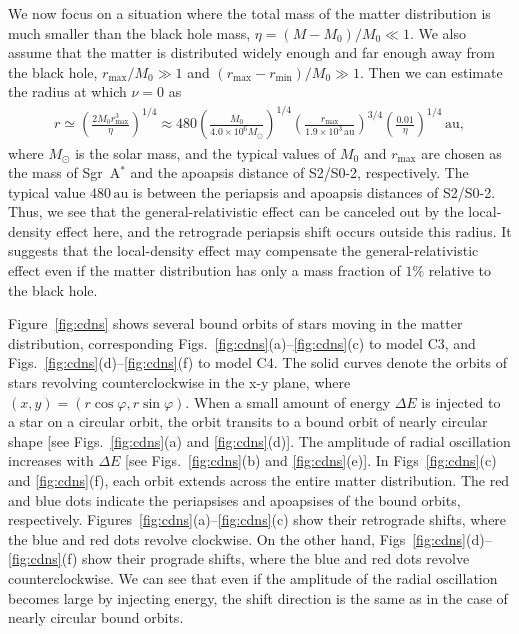 \documentclass[aps,11pt,nofootinbib,preprintnumbers,groupedaddress,superscriptaddress]{revtex4-2}
\begin{document}
We now focus on a situation where the total mass of the matter distribution is 
much smaller than the black hole mass, $\eta=(M-M_0)/M_0\ll 1$. 
We also assume that the matter is distributed widely enough and far enough away from the black hole, 
$r_{\mathrm{max}}/M_0\gg 1$ and $(r_{\mathrm{max}}-r_{\mathrm{min}})/M_0 \gg1$. 
Then we can estimate the radius at which $\nu=0$ as 
\begin{align}
r\simeq \left(\frac{2M_0 r_{\mathrm{max}}^3}{\eta}\right)^{1/4}
\approx 480 \left(\frac{M_0}{4.0\times 10^{6} M_{\odot}}\right)^{1/4}
\left(\frac{r_{\mathrm{max}}}{1.9\times 10^3 \,\mathrm{au}}\right)^{3/4}
\left(\frac{0.01}{\eta}\right)^{1/4} \,\mathrm{au},
\end{align}
where $M_\odot$ is the solar mass, and the typical values of $M_0$ and $r_{\mathrm{max}}$ are chosen as the mass of Sgr~A$^\ast$ 
and the apoapsis distance of S2/S0-2, respectively. 
The typical value $480 \,\mathrm{au}$ 
is between the periapsis and apoapsis distances of S2/S0-2.
Thus, we see that the general-relativistic effect 
can be
canceled out by the 
local-density effect here, and the retrograde 
periapsis shift occurs outside this radius. 
It suggests that the 
local-density
effect may compensate the general-relativistic effect 
even if the matter distribution has only a mass fraction of $1\%$ relative to the black hole. 



Figure~\ref{fig:cdns} shows 
several bound orbits of 
stars moving in the matter distribution,
corresponding Figs.~\ref{fig:cdns}(a)--\ref{fig:cdns}(c) to model C3, and 
Figs.~\ref{fig:cdns}(d)--\ref{fig:cdns}(f) to model C4.
The solid curves denote the orbits of stars revolving counterclockwise
in the x-y plane, where $(x,y)=(r\cos \varphi, r \sin \varphi)$. 
When a small amount of energy $\Delta E$ is injected to a star on a circular orbit, 
the orbit transits to a 
bound orbit
of nearly circular shape [see Figs.~\ref{fig:cdns}(a) and \ref{fig:cdns}(d)]. 
The amplitude of radial oscillation increases with $\Delta E$ [see Figs.~\ref{fig:cdns}(b) and \ref{fig:cdns}(e)]. In Figs~\ref{fig:cdns}(c) and \ref{fig:cdns}(f), each orbit extends across the entire matter distribution. 
The red and blue dots indicate the periapsises and apoapsises of the bound orbits, respectively.
Figures~\ref{fig:cdns}(a)--\ref{fig:cdns}(c) show their retrograde shifts, 
where the blue and red dots revolve clockwise. 
On the other hand, 
Figs~\ref{fig:cdns}(d)--\ref{fig:cdns}(f) show their prograde shifts, 
where the blue and red dots revolve counterclockwise.
We can see that even if the amplitude of the radial oscillation becomes large by injecting energy, the shift direction is the same as 
in the case of nearly circular 
bound orbits.
\end{document}
